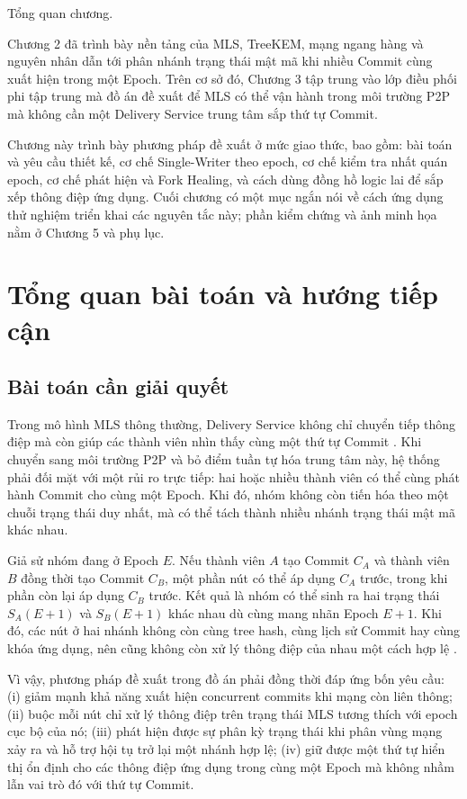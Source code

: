 \documentclass[../DoAn.tex]{subfiles}
\begin{document}
Tổng quan chương.

Chương 2 đã trình bày nền tảng của MLS, TreeKEM, mạng ngang hàng và nguyên nhân dẫn tới phân nhánh trạng thái mật mã khi nhiều Commit cùng xuất hiện trong một Epoch. Trên cơ sở đó, Chương 3 tập trung vào lớp điều phối phi tập trung mà đồ án đề xuất để MLS có thể vận hành trong môi trường P2P mà không cần một Delivery Service trung tâm sắp thứ tự Commit.

Chương này trình bày phương pháp đề xuất ở mức giao thức, bao gồm: bài toán và yêu cầu thiết kế, cơ chế Single-Writer theo epoch, cơ chế kiểm tra nhất quán epoch, cơ chế phát hiện và Fork Healing, và cách dùng đồng hồ logic lai để sắp xếp thông điệp ứng dụng. Cuối chương có một mục ngắn nói về cách ứng dụng thử nghiệm triển khai các nguyên tắc này; phần kiểm chứng và ảnh minh họa nằm ở Chương 5 và phụ lục.

\section{Tổng quan bài toán và hướng tiếp cận}
\label{sec:tong-quan-giai-phap}

\subsection{Bài toán cần giải quyết}

Trong mô hình MLS thông thường, Delivery Service không chỉ chuyển tiếp thông điệp mà còn giúp các thành viên nhìn thấy cùng một thứ tự Commit \cite{rfc9420,rfc9750}. Khi chuyển sang môi trường P2P và bỏ điểm tuần tự hóa trung tâm này, hệ thống phải đối mặt với một rủi ro trực tiếp: hai hoặc nhiều thành viên có thể cùng phát hành Commit cho cùng một Epoch. Khi đó, nhóm không còn tiến hóa theo một chuỗi trạng thái duy nhất, mà có thể tách thành nhiều nhánh trạng thái mật mã khác nhau.

Giả sử nhóm đang ở Epoch $E$. Nếu thành viên $A$ tạo Commit $C_A$ và thành viên $B$ đồng thời tạo Commit $C_B$, một phần nút có thể áp dụng $C_A$ trước, trong khi phần còn lại áp dụng $C_B$ trước. Kết quả là nhóm có thể sinh ra hai trạng thái $S_A(E+1)$ và $S_B(E+1)$ khác nhau dù cùng mang nhãn Epoch $E+1$. Khi đó, các nút ở hai nhánh không còn cùng tree hash, cùng lịch sử Commit hay cùng khóa ứng dụng, nên cũng không còn xử lý thông điệp của nhau một cách hợp lệ \cite{alwen2023fork,kohbrok2025dmls}.

Vì vậy, phương pháp đề xuất trong đồ án phải đồng thời đáp ứng bốn yêu cầu: (i) giảm mạnh khả năng xuất hiện concurrent commits khi mạng còn liên thông; (ii) buộc mỗi nút chỉ xử lý thông điệp trên trạng thái MLS tương thích với epoch cục bộ của nó; (iii) phát hiện được sự phân kỳ trạng thái khi phân vùng mạng xảy ra và hỗ trợ hội tụ trở lại một nhánh hợp lệ; (iv) giữ được một thứ tự hiển thị ổn định cho các thông điệp ứng dụng trong cùng một Epoch mà không nhầm lẫn vai trò đó với thứ tự Commit.
\end{document}
